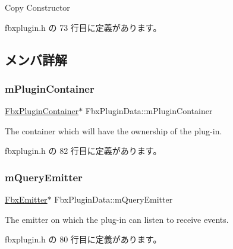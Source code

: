 Copy Constructor 



 fbxplugin.\+h の 73 行目に定義があります。



\subsection{メンバ詳解}
\mbox{\label{struct_fbx_plugin_data_aa77748ca8ef7942f31b0c29aadc8d789}} 
\subsubsection{\texorpdfstring{m\+Plugin\+Container}{mPluginContainer}}
{\footnotesize\ttfamily \hyperlink{class_fbx_plugin_container}{Fbx\+Plugin\+Container}$\ast$ Fbx\+Plugin\+Data\+::m\+Plugin\+Container}



The container which will have the ownership of the plug-\/in. 



 fbxplugin.\+h の 82 行目に定義があります。

\mbox{\label{struct_fbx_plugin_data_a56d73d6518e4691e6f119b8362f1dff6}} 
\subsubsection{\texorpdfstring{m\+Query\+Emitter}{mQueryEmitter}}
{\footnotesize\ttfamily \hyperlink{class_fbx_emitter}{Fbx\+Emitter}$\ast$ Fbx\+Plugin\+Data\+::m\+Query\+Emitter}



The emitter on which the plug-\/in can listen to receive events. 



 fbxplugin.\+h の 80 行目に定義があります。

\mbox{\label{struct_fbx_plugin_data_abf03db73893382d5b5c7d46a3485f53d}} 
